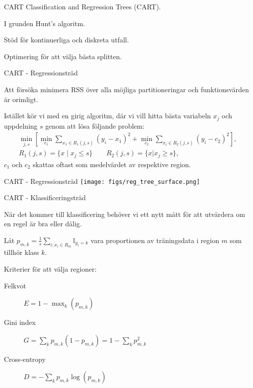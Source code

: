 \documentclass[10pt,english]{beamer}
\begin{document}
\begin{frame}{CART}
    Classification and Regression Trees (CART).

    I grunden Hunt's algoritm.

    Stöd för kontinuerliga och diskreta utfall.

    Optimering för att välja bästa splitten.
\end{frame}

\begin{frame}{CART - Regressionsträd}
    
    Att försöka minimera RSS över alla möjliga partitioneringar och funktionsvärden är orimligt.

    Istället kör vi med en girig algoritm, där vi vill hitta bästa variabeln $x_j$ och uppdelning $s$ genom att lösa följande problem:
    \begin{align*}
        \min_{j,s} \left[ \min_{c_1} \sum_{x_1 \in R_1(j,s)} (y_i - x_1)^2 + \min_{c_2} \sum_{x_i \in R_2(j,s)} (y_i - c_2)^2 \right], \\
        R_1(j,s) = \{x \mid x_j \leq s\} \qquad R_2(j,s) = \{x | x_j \geq s\},
    \end{align*}
    $c_1$ och $c_2$ skattas oftast som medelvärdet av respektive region.
\end{frame}

\begin{frame}{CART - Regressionsträd}
    \texttt{[image: figs/reg\_tree\_surface.png]}
\end{frame}

\begin{frame}{CART - Klassificeringsträd}
    
    När det kommer till klassificering behöver vi ett nytt mått för att utvärdera om en regel är bra eller dålig.

    Låt $p_{m,k} = \frac{1}{s} \sum_{i : x_i \in R_m} \mathbb{I}_{y_i = k}$ vara proportionen av träningsdata i region $m$ som tillhör klass $k$.

    Kriterier för att välja regioner:
    \begin{description}
        \item[Felkvot] $E = 1 - \max_{k} (p_{m,k})$
        \item[Gini index] $G = \sum_{k} p_{m,k} ( 1 - p_{m,k}) = 1 - \sum_{k} p_{m,k}^2$
        \item[Cross-entropy] $D = - \sum_{k} p_{m,k} \log(p_{m,k})$   
    \end{description}

\end{frame}
\end{document}
